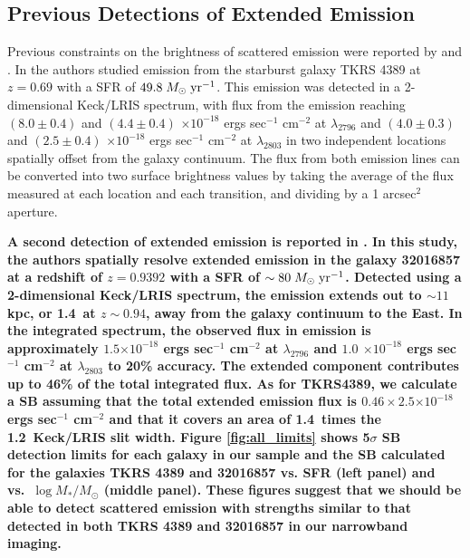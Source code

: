 \documentclass[trackchanges,twocolumn]{aastex62}
\def \msunperyr {{\; M_{\odot}\rm \;yr^{-1}}}
\begin{document}
\subsection{Previous Detections of Extended  Emission}
Previous constraints on the brightness of scattered  emission were reported by \cite{Rubin_2011} and \cite{Martin2013}. In \cite{Rubin_2011} the authors studied emission from the starburst galaxy TKRS 4389 at $z = 0.69$ with a SFR of $49.8\msunperyr$. This emission was detected in a 2-dimensional Keck/LRIS spectrum, with flux from the emission reaching $(8.0 \pm 0.4)$ and $(4.4 \pm 0.4)$ $\times10^{-18}$ ergs sec$^{-1}$ cm$^{-2}$ at  $\lambda _{2796}$ and $(4.0 \pm 0.3)$ and $(2.5 \pm 0.4)$ $\times10^{-18}$ ergs sec$^{-1}$ cm$^{-2}$ at $\lambda_{2803}$ in two independent locations spatially offset from the galaxy continuum. The flux from both emission lines can be converted into two surface brightness values by taking the average of the flux measured at each location and each transition, and dividing by a 1 arcsec$^2$ aperture. 

\textbf{A second detection of extended  emission is reported in \cite{Martin2013}. In this study, the authors spatially resolve extended  emission in the galaxy 32016857 at a redshift of $z=0.9392$ with a SFR of $\sim 80\msunperyr$. Detected using a 2-dimensional Keck/LRIS spectrum, the  emission extends out to $\sim11$ kpc, or 1.4\arcsec\ at $z\sim 0.94$, away from the galaxy continuum to the East. In the integrated spectrum, the observed flux in  emission is approximately $1.5$$\times10^{-18}$ ergs sec$^{-1}$ cm$^{-2}$ at  $\lambda _{2796}$ and $ 1.0$ $\times10^{-18}$ ergs sec$^{-1}$ cm$^{-2}$ at $\lambda_{2803}$ to 20\% accuracy. The extended  component contributes up to 46\% of the total integrated  flux.  As for TKRS4389, we calculate a SB  assuming that the total extended  emission flux is $0.46\times2.5$$\times10^{-18}$ ergs sec$^{-1}$ cm$^{-2}$ and that it covers an area of 1.4\arcsec\ times the 1.2\arcsec\ Keck/LRIS slit width. Figure \ref{fig:all_limits} shows 5$\sigma$ SB detection limits for each galaxy in our sample and the SB calculated for the galaxies TKRS 4389 and 32016857 vs. SFR (left panel) and vs.\ $\log M_*/M_{\odot}$ (middle panel). These figures suggest that we should be able to detect scattered  emission with strengths similar to that detected in both TKRS 4389 and 32016857 in our narrowband imaging.}
\end{document}
